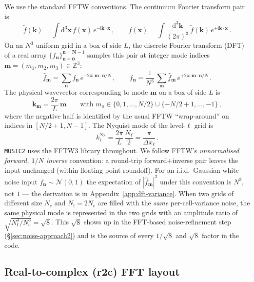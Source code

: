 \documentclass[12pt]{article}
\newcommand{\bk}{\mathbf{k}}
\newcommand{\bx}{\mathbf{x}}
\newcommand{\bn}{\mathbf{n}}
\newcommand{\bN}{\mathbf{N}}
\newcommand{\bm}{\mathbf{m}}
\begin{document}
We use the standard FFTW conventions.  The continuum
Fourier transform pair is
\begin{equation}
  \tilde f(\bk) = \int \mathrm{d}^3 \bx \, f(\bx)\,e^{-\mathrm{i}\bk\cdot\bx}\,,
  \qquad
  f(\bx) = \int \frac{\mathrm{d}^3\bk}{(2\pi)^3}\,\tilde f(\bk)\,e^{+\mathrm{i}\bk\cdot\bx}\,.
  \label{eq:CFT-conv}
\end{equation}
On an $N^3$ uniform grid in a box of side $L$, the discrete Fourier
transform (DFT) of a real array
$\{f_\bn\}_{\bn=\mathbf{0}}^{\bn=\bN-1}$ samples this pair at integer
mode indices $\bm = (m_1,m_2,m_3) \in \mathbb{Z}^3$:
\begin{equation}
  \hat f_\bm = \sum_{\bn} f_\bn\,e^{-2\pi\mathrm{i}\,\bm\cdot\bn/N}\,,
  \qquad
  f_\bn = \frac{1}{N^3}\,\sum_\bm \hat f_\bm\,e^{+2\pi\mathrm{i}\,\bm\cdot\bn/N}\,.
  \label{eq:DFT-conv}
\end{equation}
The physical wavevector corresponding to mode $\bm$ on a box of side
$L$ is
\begin{equation}
  \bk_\bm = \frac{2\pi}{L}\,\bm \qquad\text{with } m_a \in \{0, 1, \ldots, N/2\} \cup \{-N/2+1, \ldots, -1\}\,,
  \label{eq:k-of-m}
\end{equation}
where the negative half is identified by the usual FFTW
``wrap-around'' on indices in $[N/2+1, N-1]$.  The Nyquist mode of
the level-$\ell$ grid is
\begin{equation}
  k^\mathrm{Ny}_\ell = \frac{2\pi}{L}\,\frac{N_\ell}{2} = \frac{\pi}{\Delta x_\ell}\,.
  \label{eq:nyquist}
\end{equation}
\texttt{MUSIC2} uses the FFTW3 library throughout.  We follow FFTW's
\emph{unnormalised forward, $1/N$ inverse} convention: a round-trip
forward+inverse pair leaves the input unchanged (within
floating-point roundoff).  For an i.i.d.\ Gaussian white-noise input
$f_\bn \sim \mathcal{N}(0,1)$ the expectation of $|\hat f_\bm|^2$
under this convention is $N^3$, not $1$ --- the derivation is in
Appendix~\ref{app:dft-variance}.  When two grids of different size
$N_\mathrm{c}$ and $N_\mathrm{f} = 2 N_\mathrm{c}$ are filled with
the \emph{same} per-cell-variance noise, the same physical mode is
represented in the two grids with an amplitude ratio of
$\sqrt{N_\mathrm{f}^3 / N_\mathrm{c}^3} = \sqrt{8}$.  This $\sqrt{8}$
shows up in the FFT-based noise-refinement step
(\S\ref{sec:noise-approach2}) and is the source of every $1/\sqrt{8}$
and $\sqrt{8}$ factor in the code.

\subsection{Real-to-complex (r2c) FFT layout}
\label{sec:notation-r2c}
\end{document}
